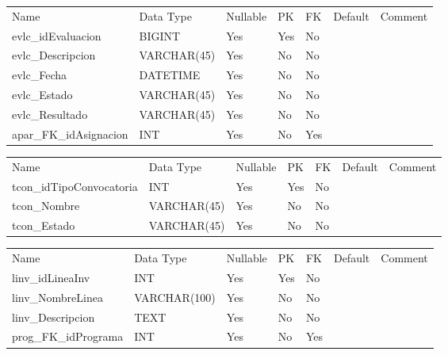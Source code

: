 			\begin{center}
				\begin{tabular}{ |l|l|l|l|l|l|l| }
					\hline
					Name & Data Type & Nullable & PK & FK & Default & Comment \\
					evlc_idEvaluacion & BIGINT & Yes & Yes & No &  & \\ \hline 
evlc_Descripcion & VARCHAR(45) & Yes & No & No &  & \\ \hline 
evlc_Fecha & DATETIME & Yes & No & No &  & \\ \hline 
evlc_Estado & VARCHAR(45) & Yes & No & No &  & \\ \hline 
evlc_Resultado & VARCHAR(45) & Yes & No & No &  & \\ \hline 
apar_FK_idAsignacion & INT & Yes & No & Yes &  & \\ \hline 

				\end{tabular}
			\end{center}
		

			\begin{center}
				\begin{tabular}{ |l|l|l|l|l|l|l| }
					\hline
					Name & Data Type & Nullable & PK & FK & Default & Comment \\
					tcon_idTipoConvocatoria & INT & Yes & Yes & No &  & \\ \hline 
tcon_Nombre & VARCHAR(45) & Yes & No & No &  & \\ \hline 
tcon_Estado & VARCHAR(45) & Yes & No & No &  & \\ \hline 

				\end{tabular}
			\end{center}
		

			\begin{center}
				\begin{tabular}{ |l|l|l|l|l|l|l| }
					\hline
					Name & Data Type & Nullable & PK & FK & Default & Comment \\
					linv_idLineaInv & INT & Yes & Yes & No &  & \\ \hline 
linv_NombreLinea & VARCHAR(100) & Yes & No & No &  & \\ \hline 
linv_Descripcion & TEXT & Yes & No & No &  & \\ \hline 
prog_FK_idPrograma & INT & Yes & No & Yes &  & \\ \hline 

				\end{tabular}
			\end{center}
		

